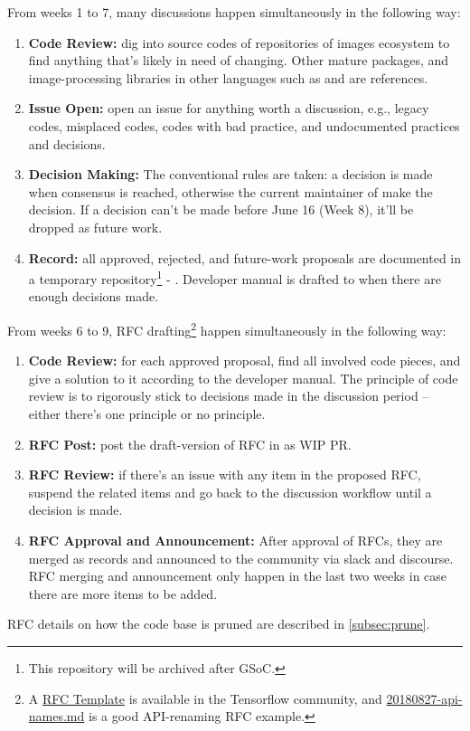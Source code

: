 From weeks 1 to 7, many discussions happen simultaneously in the following way:
\begin{enumerate}
    \item \textbf{Code Review:} dig into source codes of repositories of images ecosystem to find anything that's likely in need of changing. Other mature \langjulia{} packages, and image-processing libraries in other languages such as \reposcikitimage{} and \matlabimageprocessing{} are references.
    \item \textbf{Issue Open:} open an issue for anything worth a discussion, e.g., legacy codes, misplaced codes, codes with bad practice, and undocumented practices and decisions.
    \item \textbf{Decision Making:} The conventional rules are taken: a decision is made when consensus is reached, otherwise the current maintainer of \images{} make the decision. If a decision can't be made before June 16 (Week 8), it'll be dropped as future work.
    \item \textbf{Record:} all approved, rejected, and future-work proposals are documented in a temporary repository\footnote{This repository will be archived after GSoC.} - \repogsoctempdoc{}. Developer manual is drafted to \repoimagesgithubio{} when there are enough decisions made.
\end{enumerate}

From weeks 6 to 9, RFC drafting\footnote{A \href{https://github.com/tensorflow/community/blob/master/rfcs/yyyymmdd-rfc-template.md}{RFC Template} is available in the Tensorflow community, and \href{https://github.com/tensorflow/community/blob/master/rfcs/20180827-api-names.md}{20180827-api-names.md} is a good API-renaming RFC example.} happen simultaneously in the following way:
\begin{enumerate}
    \item \textbf{Code Review:} for each approved proposal, find all involved code pieces, and give a solution to it according to the developer manual. The principle of code review is to rigorously stick to decisions made in the discussion period -- either there's one principle or no principle.
    \item \textbf{RFC Post:} post the draft-version of RFC in \repoimagesgithubio{} as WIP PR.
    \item \textbf{RFC Review:} if there's an issue with any item in the proposed RFC, suspend the related items and go back to the discussion workflow until a decision is made.
    \item \textbf{RFC Approval and Announcement:} After approval of RFCs, they are merged as records and announced to the community via slack and discourse. RFC merging and announcement only happen in the last two weeks in case there are more items to be added.
\end{enumerate}
RFC details on how the code base is pruned are described in \cref{subsec:prune}.

